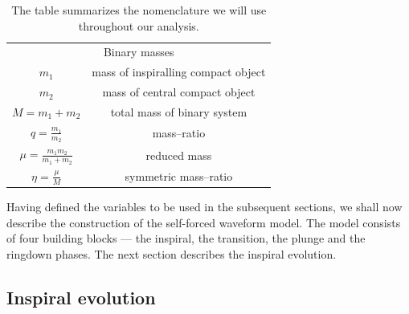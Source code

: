 \begin{table}[thb]
\centering
\begin{tabular}{|c| c| }
\hline
\multicolumn{2}{|c|}{Binary masses}  \\\cline{1-2} 
\(m_1\) & mass of inspiralling compact object  \\ [0.7ex] 
\(m_2 \) & mass of central compact object  \\ [0.7ex]  
\(M=m_1+m_2 \) & total mass of binary system \\ [0.7ex]  
\(q=\frac{m_1}{m_2} \) & mass--ratio \\ [0.9ex]  
\(\mu=\frac{m_1 m_2}{m_1 + m_2} \) & reduced mass \\ [0.9ex]  
\(\eta= \frac{\mu}{M}\) & symmetric mass--ratio \\ [0.9ex]  
\hline
\end{tabular}
\caption{The table summarizes the nomenclature we will use throughout our analysis.}
\label{length}
\end{table}

Having defined the variables to be used in the subsequent sections, we shall now describe the construction of the self-forced waveform model. The model consists of four building blocks --- the inspiral, the transition, the plunge and the ringdown phases. The next section describes the inspiral evolution. 

\subsection{Inspiral evolution}


